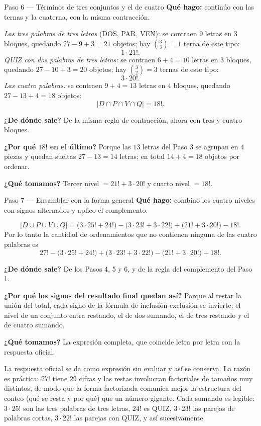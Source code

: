 \documentclass[11pt]{article}
\begin{document}
\begin{paso}{Paso 6 --- Términos de tres conjuntos y el de cuatro}
\textbf{Qué hago:} continúo con las ternas y la cuaterna, con la misma contracción.

\emph{Las tres palabras de tres letras} (DOS, PAR, VEN): se contraen $9$ letras en $3$ bloques, quedando $27-9+3 = 21$ objetos; hay $\binom{3}{3}=1$ terna de este tipo:
\[
1\cdot 21! .
\]
\emph{QUIZ con dos palabras de tres letras:} se contraen $6+4 = 10$ letras en $3$ bloques, quedando $27-10+3 = 20$ objetos; hay $\binom{3}{2}=3$ ternas de este tipo:
\[
3\cdot 20! .
\]
\emph{Las cuatro palabras:} se contraen $9+4 = 13$ letras en $4$ bloques, quedando $27-13+4 = 18$ objetos:
\[
|D\cap P\cap V\cap Q| = 18! .
\]

\textbf{¿De dónde sale?} De la misma regla de contracción, ahora con tres y cuatro bloques.

\textbf{¿Por qué $18!$ en el último?} Porque las $13$ letras del Paso 3 se agrupan en $4$ piezas y quedan sueltas $27-13 = 14$ letras; en total $14+4 = 18$ objetos por ordenar.

\textbf{¿Qué tomamos?} Tercer nivel $= 21! + 3\cdot 20!$ y cuarto nivel $= 18!$.
\end{paso}

\begin{paso}{Paso 7 --- Ensamblar con la forma general}
\textbf{Qué hago:} combino los cuatro niveles con signos alternados y aplico el complemento.

\[
|D\cup P\cup V\cup Q| = \bigl(3\cdot 25!+24!\bigr) - \bigl(3\cdot 23!+3\cdot 22!\bigr) + \bigl(21!+3\cdot 20!\bigr) - 18! .
\]
Por lo tanto la cantidad de ordenamientos que no contienen ninguna de las cuatro palabras es
\[
27! - \bigl(3\cdot 25!+24!\bigr) + \bigl(3\cdot 23!+3\cdot 22!\bigr) - \bigl(21!+3\cdot 20!\bigr) + 18! .
\]

\textbf{¿De dónde sale?} De los Pasos 4, 5 y 6, y de la regla del complemento del Paso 1.

\textbf{¿Por qué los signos del resultado final quedan así?} Porque al restar la unión del total, cada signo de la fórmula de inclusión-exclusión se invierte: el nivel de un conjunto entra restando, el de dos sumando, el de tres restando y el de cuatro sumando.

\textbf{¿Qué tomamos?} La expresión completa, que coincide letra por letra con la respuesta oficial.
\end{paso}

\begin{nota}
La respuesta oficial se da como expresión sin evaluar y así se conserva. La razón es práctica: $27!$ tiene $29$ cifras y las restas involucran factoriales de tamaños muy distintos, de modo que la forma factorizada comunica mejor la estructura del conteo (qué se resta y por qué) que un número gigante. Cada sumando es legible: $3\cdot 25!$ son las tres palabras de tres letras, $24!$ es QUIZ, $3\cdot 23!$ las parejas de palabras cortas, $3\cdot 22!$ las parejas con QUIZ, y así sucesivamente.
\end{nota}
\end{document}
